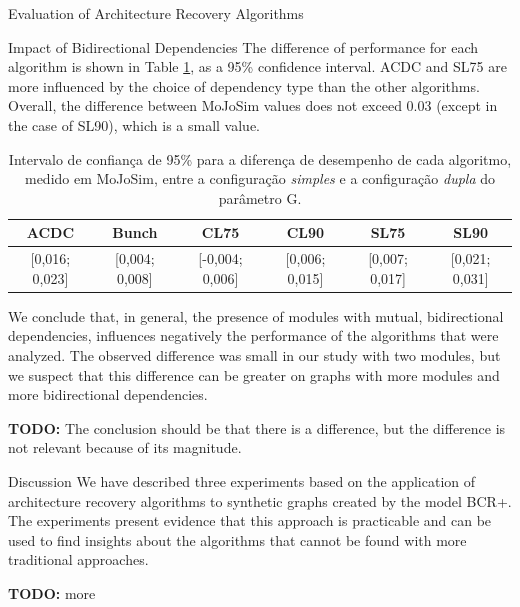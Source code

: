 \documentclass[11pt,twocolumn,a4paper,english]{article}
\newcommand{\TODO}{\textbf{TODO:} }
\begin{document}
\begin{section}{Evaluation of Architecture Recovery Algorithms}
\begin{subsection}{Impact of Bidirectional Dependencies}
	The difference of performance for each algorithm is shown in Table \ref{tab:exp-dependencies}, as a 95\% confidence interval. ACDC and SL75 are more influenced by the choice of dependency type than the other algorithms. Overall, the difference between MoJoSim values does not exceed 0.03 (except in the case of SL90), which is a small value.
	
	\begin{table}[width=\textwidth]
	  \begin{center}
	  \begin{tabular}{cccccc}
	    \hline
	    \textbf{ACDC} & \textbf{Bunch} & \textbf{CL75} & \textbf{CL90} & \textbf{SL75} & \textbf{SL90} \\
	    \hline
	    \hline
	    \footnotesize{[0,016; 0,023]} & \footnotesize{[0,004; 0,008]} & \footnotesize{[-0,004; 0,006]} & \footnotesize{[0,006; 0,015]} & \footnotesize{[0,007; 0,017]} & \footnotesize{[0,021; 0,031]} \\
	    \hline
	  \end{tabular}
	  \end{center}
	  \caption{Intervalo de confiança de 95\% para a diferença de desempenho de cada algoritmo, medido em MoJoSim, entre a configuração \emph{simples} e a configuração \emph{dupla} do parâmetro G.}
	  \label{tab:exp-dependencies}
	\end{table}
	
	We conclude that, in general, the presence of modules with mutual, bidirectional dependencies, influences negatively the performance of the algorithms that were analyzed. The observed difference was small in our study with two modules, but we suspect that this difference can be greater on graphs with more modules and more bidirectional dependencies.

	\TODO The conclusion should be that there is a difference, but the difference is not relevant because of its magnitude.
	
\end{subsection}

\begin{subsection}{Discussion}
	We have described three experiments based on the application of architecture recovery algorithms to synthetic graphs created by the model BCR+. The experiments present evidence that this approach is practicable and can be used to find insights about the algorithms that cannot be found with more traditional approaches.
	
	\TODO more
	
\end{subsection}

\end{section}
\end{document}
